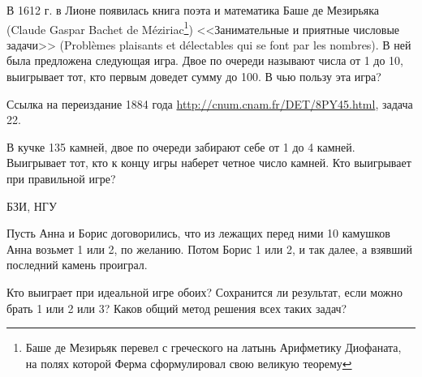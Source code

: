 \begin{problem}
В 1612 г. в Лионе появилась книга поэта и математика Баше де Мезирьяка (Claude Gaspar Bachet de M\'eziriac\footnote{Баше де Мезирьяк перевел с греческого на латынь Арифметику Диофаната, на полях которой Ферма сформулировал свою великую теорему}) <<Занимательные и приятные числовые задачи>> (Probl\`emes plaisants et d\'electables qui se font par les nombres). В ней была предложена следующая игра. Двое по очереди называют числа от 1 до 10, выигрывает тот, кто первым доведет сумму до 100. В чью пользу эта игра?\par
Ссылка на переиздание 1884 года \url{http://cnum.cnam.fr/DET/8PY45.html}, задача 22.



\begin{sol}

\end{sol}
\end{problem}


\begin{problem}
В кучке 135 камней, двое по очереди забирают себе от 1 до 4 камней. Выигрывает тот, кто к концу игры наберет четное число камней. Кто выигрывает при правильной игре?\par

\begin{sol}
\end{sol}
\end{problem}


\begin{problem}[Камешки.]\begin{source}
БЗИ, НГУ
\end{source} Пусть Анна и Борис договорились, что
из лежащих перед ними 10 камушков Анна возьмет 1 или 2, по
желанию. Потом Борис 1 или 2, и так далее, а взявший
последний камень проиграл.

Кто выиграет при идеальной игре обоих? Сохранится ли
результат, если можно брать 1 или 2 или 3? Каков общий
метод решения всех таких задач?



\begin{sol}

\end{sol}
\end{problem}





